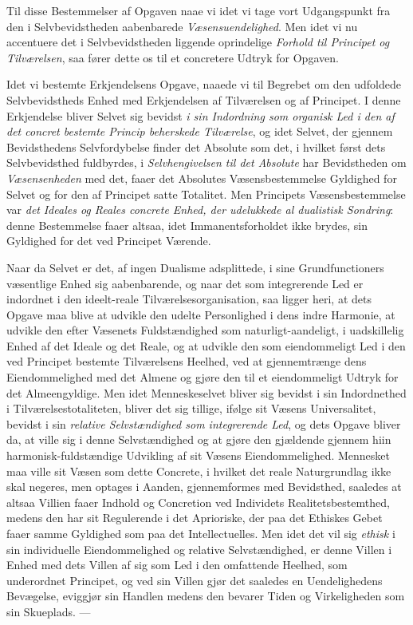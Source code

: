 Til disse Bestemmelser af Opgaven naae vi idet vi tage vort Udgangspunkt fra
den i Selvbevidstheden aabenbarede \emph{Væsensuendelighed}. Men idet vi nu
accentuere det i Selvbevidstheden liggende oprindelige \emph{Forhold til
Principet og Tilværelsen}, saa fører dette os til et concretere Udtryk for
Opgaven.

Idet vi bestemte Erkjendelsens Opgave, naaede vi til Begrebet om den udfoldede
Selvbevidstheds Enhed med Erkjendelsen af Tilværelsen og af Principet. I denne
Erkjendelse bliver Selvet sig bevidst \emph{i sin Indordning som organisk Led i
den af det concret bestemte Princip beherskede Tilværelse}, og idet Selvet, der
gjennem Bevidsthedens Selvfordybelse finder det Absolute som det, i hvilket
først dets Selvbevidsthed fuldbyrdes, i \emph{Selvhengivelsen til det Absolute}
har Bevidstheden om \emph{Væsensenheden} med det, faaer det Absolutes
Væsensbestemmelse Gyldighed for Selvet og for den af Principet satte Totalitet.
Men Principets Væsensbestemmelse var \emph{det}
 \emph{Ideales og Reales concrete Enhed, der udelukkede al dualistisk Sondring}:
denne Bestemmelse faaer altsaa, idet Immanentsforholdet ikke brydes, sin
Gyldighed for det ved Principet Værende.

Naar da Selvet er det, af ingen Dualisme adsplittede, i sine Grundfunctioners
væsentlige Enhed sig aabenbarende, og naar det som integrerende Led er indordnet
i den ideelt-reale Tilværelsesorganisation, saa ligger heri, at dets Opgave maa
blive at udvikle den udelte Personlighed i dens indre Harmonie, at udvikle den
efter Væsenets Fuldstændighed som naturligt-aandeligt, i uadskillelig Enhed af
det Ideale og det Reale, og at udvikle den som eiendommeligt Led i den ved
Principet bestemte Tilværelsens Heelhed, ved at gjennemtrænge dens
Eiendommelighed med det Almene og gjøre den til et eiendommeligt Udtryk for det
Almeengyldige. Men idet Menneskeselvet bliver sig bevidst i sin Indordnethed i
Tilværelsestotaliteten, bliver det sig tillige, ifølge sit Væsens
Universalitet, bevidst i sin \emph{relative Selvstændighed som integrerende
Led}, og dets Opgave bliver da, at ville sig i denne Selvstændighed og at gjøre
den gjældende gjennem hiin harmonisk-fuldstændige Udvikling af sit Væsens
Eiendommelighed. Mennesket maa ville sit Væsen som dette Concrete, i hvilket
det reale Naturgrundlag ikke skal negeres, men optages i Aanden, gjennemformes
med Bevidsthed, saaledes at altsaa Villien faaer Indhold og Concretion ved
Individets Realitetsbestemthed, medens den har sit Regulerende i det
Aprioriske, der paa det Ethiskes Gebet faaer samme Gyldighed som paa det
Intellectuelles. Men idet det vil sig \emph{ethisk} i sin individuelle
Eiendommelighed og relative Selvstændighed, er denne Villen i Enhed med dets
Villen af sig som Led i den omfattende Heelhed, som underordnet Principet, og
ved sin Villen gjør det saaledes en Uendelighedens Bevægelse, eviggjør sin
Handlen medens den bevarer Tiden og Virkeligheden som sin Skueplads. ---

